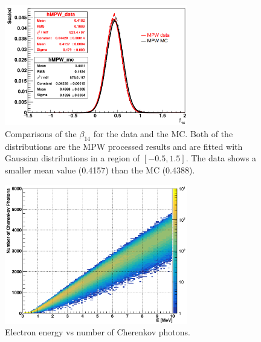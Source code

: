 \begin{figure}[htbp]
	\centering
	\includegraphics[width=8cm]{N16FitMPW_beta14_107055.png}
	\caption{Comparisons of the $\beta_{14}$ for the data and the MC. Both of the distributions are the MPW processed results and are fitted with Gaussian distributions in a region of $[-0.5,1.5]$. The data shows a smaller mean value (0.4157) than the MC (0.4388).}
	\label{N16beta14MPW}
\end{figure}

\begin{figure}[htbp]
	\centering
	\includegraphics[width=8cm]{2dmap_EvsNphoton.png}
	\caption{Electron energy vs number of Cherenkov photons.}
	\label{N16energyMap}
\end{figure}







